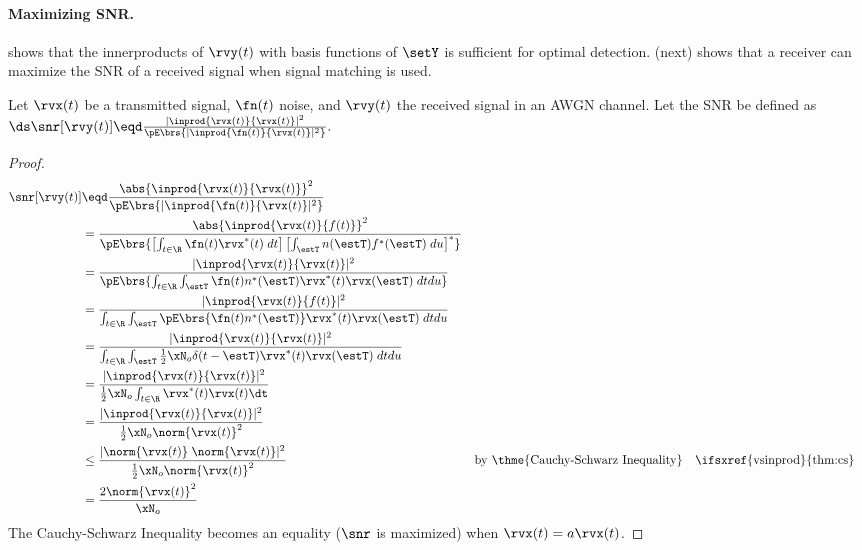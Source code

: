 \paragraph{Maximizing SNR.}
 shows that the innerproducts of $\rvy(t)$ with
basis functions of $\setY$ is sufficient for optimal detection.
 (next) shows that a receiver can
maximize the SNR of a received signal when signal matching is used.

\begin{theorem}
\label{thm:mf_maxSNR}
Let $\rvx(t)$ be a transmitted signal, $\fn(t)$ noise, and $\rvy(t)$ the received signal
in an AWGN channel.
Let the  SNR be defined as
\\\indentx$\ds
      \snr[\rvy(t)] \eqd \frac{|\inprod{\rvx(t)}{\rvx(t)}|^2}
                            {\pE\brs{|\inprod{\fn(t)}{\rvx(t)}|^2}}.
          $
\end{theorem}

\begin{proof}
\begin{align*}
   \snr[\rvy(t)]
     &\eqd \frac{\abs{\inprod{\rvx(t)}{\rvx(t)}}^2}
                {\pE\brs{|\inprod{\fn(t)}{\rvx(t)}|^2}}
   \\&=    \frac{\abs{\inprod{\rvx(t)}{f(t)}}^2}
                {\pE\brs{\left[\int_{t\in\R} \fn(t)\rvx^\ast(t)\;dt\right]
                      \left[\int_{\estT} n(\estT)f^\ast(\estT)\;du\right]^\ast}
                }
   \\&=    \frac{|\inprod{\rvx(t)}{\rvx(t)}|^2}
                {\pE\brs{\int_{t\in\R} \int_{\estT} \fn(t)n^\ast(\estT)\rvx^\ast(t)\rvx(\estT)\;dtdu}}
   \\&=    \frac{|\inprod{\rvx(t)}{f(t)}|^2}
                {\int_{t\in\R} \int_{\estT} \pE\brs{\fn(t)n^\ast(\estT)}\rvx^\ast(t)\rvx(\estT)\;dtdu}
   \\&=    \frac{|\inprod{\rvx(t)}{\rvx(t)}|^2}
                {\int_{t\in\R} \int_{\estT} \frac{1}{2}\xN_o\delta(t-\estT) \rvx^\ast(t)\rvx(\estT)\;dtdu}
   \\&=    \frac{|\inprod{\rvx(t)}{\rvx(t)}|^2}
                {\frac{1}{2}\xN_o \int_{t\in\R} \rvx^\ast(t)\rvx(t)\dt}
   \\&=    \frac{|\inprod{\rvx(t)}{\rvx(t)}|^2}
                {\frac{1}{2}\xN_o \norm{\rvx(t)}^2}
   \\&\le  \frac{|\norm{\rvx(t)}\;\norm{\rvx(t)}|^2}
                {\frac{1}{2}\xN_o \norm{\rvx(t)}^2}
     &&    \text{by \thme{Cauchy-Schwarz Inequality}}
     &&    \text{\ifsxref{vsinprod}{thm:cs}}
   \\&=    \frac{2\norm{\rvx(t)}^2}
                {\xN_o }
\end{align*}
The Cauchy-Schwarz Inequality becomes an equality
($\snr$ is maximized) when $\rvx(t)=a\rvx(t)$.
\end{proof}

